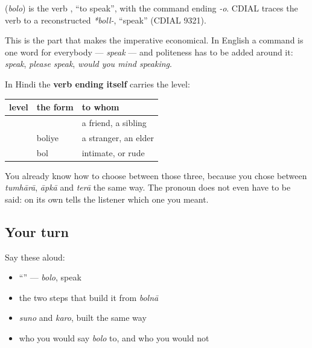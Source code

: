 \begin{cousinweb}
\textbf{} (\emph{bolo}) is the verb \textbf{}, \textquotedblleft{}to speak\textquotedblright{}, with the command ending \emph{-o}. CDIAL traces the verb to a reconstructed \emph{*boll-}, \textquotedblleft{}speak\textquotedblright{} (CDIAL 9321).
\end{cousinweb}

\begin{grammarlens}[title={Grammar Lens: the command carries the level, and nothing else has to}]
This is the part that makes the imperative economical. In English a command is one word for everybody — \emph{speak} — and politeness has to be added around it: \emph{speak}, \emph{please speak}, \emph{would you mind speaking}.

In Hindi the \textbf{verb ending itself} carries the level:

\noindent
\begin{tabularx}{\linewidth}{@{}>{\raggedright\arraybackslash}X>{\raggedright\arraybackslash}X>{\raggedright\arraybackslash}X@{}}
\toprule
\textbf{level} & \textbf{the form} & \textbf{to whom} \\
\midrule
\hi{तुम} & \textbf{\hi{बोलो}} & a friend, a sibling \\
\hi{आप} & boliye & a stranger, an elder \\
\hi{तू} & bol & intimate, or rude \\
\bottomrule
\end{tabularx}

You already know how to choose between those three, because you chose between \emph{tumhārā}, \emph{āpkā} and \emph{terā} the same way. The pronoun does not even have to be said: \textbf{} on its own tells the listener which one you meant.
\end{grammarlens}

\subsection*{Your turn}
Say these aloud:

\begin{itemize}
\raggedright
  \item \textquotedblleft{}\textquotedblright{} — \emph{bolo}, speak
  \item the two steps that build it from \emph{bolnā}
  \item \emph{suno} and \emph{karo}, built the same way
  \item who you would say \emph{bolo} to, and who you would not
\end{itemize}

